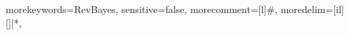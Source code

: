 \newcommand{\colx}[1]{{\textcolor{tcol}{#1}}}

\newcommand{\rbprmt}{ > }
\newcommand{\rbcl}[1]{\exs{\cl{\rbprmt{#1}}}}
\newcommand{\rbout}[1]{\cl{\textcolor{outputcol}{#1}}}
\newcommand{\rbdn}{{\Large \symbol{126}}} %
\newcommand{\rbclml}[1]{\exs{\cl{\ \ \ \ \ \ \ \ \ \ \ {#1}}}}




{morekeywords={RevBayes},
sensitive=false,
morecomment=[l]{\#},
moredelim=[il][\color{gray}\ttfamily]{|*},
}
\lstset{
    language=Rev,
    basicstyle=\ttfamily,
    columns=flexible
}


\newcommand{\bibAnnoteFile}[1]{%
\IfFileExists{#1}{\begin{quotation}\noindent\textsc{Key:} #1\\
\textsc{Annotation:}\ \end{quotation}}{}}

\newcommand{\bibAnnote}[2]{%
\begin{quotation}\noindent\textsc{Key:} #1\\
\textsc{Annotation:}\ #2\end{quotation}}





\makeatletter
\lst@CCPutMacro{}
\@empty\z@\@empty
\makeatother

\newcommand{\impmark}{\strut\vadjust{\domark}}
\newcommand{\domark}{%
  \vbox to 0pt{
    \kern-\dp\strutbox
    \smash{\llap{$\rightarrow$\kern1em}}
    \vss
  }%
}

